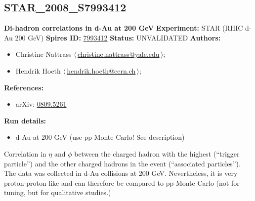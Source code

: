 \subsection[STAR\_2008\_S7993412]{STAR\_2008\_S7993412\,\cite{Nattrass:2008tw}}
\textbf{Di-hadron correlations in d-Au at 200 GeV}\newline
\textbf{Experiment:} STAR (RHIC d-Au 200 GeV) \newline
\textbf{Spires ID:} \href{http://www.slac.stanford.edu/spires/find/hep/www?rawcmd=key+7993412}{7993412}\newline
\textbf{Status:} UNVALIDATED\newline
\textbf{Authors:}
\begin{itemize}
  \item Christine Nattrass $\langle\,$\href{mailto:christine.nattrass@yale.edu}{christine.nattrass@yale.edu}$\,\rangle$;
  \item Hendrik Hoeth $\langle\,$\href{mailto:hendrik.hoeth@cern.ch}{hendrik.hoeth@cern.ch}$\,\rangle$;
\end{itemize}
\textbf{References:}
\begin{itemize}
  \item arXiv: \href{http://arxiv.org/abs/0809.5261}{0809.5261}
\end{itemize}
\textbf{Run details:}
\begin{itemize}

  \item d-Au at 200 GeV (use pp Monte Carlo! See description)\end{itemize}

\noindent Correlation in $\eta$ and $\phi$ between the charged hadron with the highest \pT (``trigger particle'') and the other charged hadrons in the event (``associated particles''). The data was collected in d-Au collisions at 200 GeV. Nevertheless, it is very proton-proton like and can therefore be compared to pp Monte Carlo (not for tuning, but for qualitative studies.)

\clearpage


\clearpage

